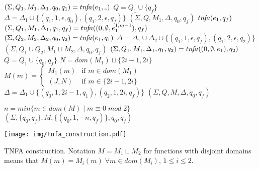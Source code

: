 \documentclass[AMA,STIX1COL]{WileyNJD-v2}
\let\oldnl\nl
\newcommand{\nonl}{\renewcommand{\nl}{\let\nl\oldnl}} %
\newcommand{\Xund}{\rule{.4em}{.4pt}}
\begin{document}
\begin{algorithm}[]
\begin{multicols}{2}
{{            $(\Sigma, Q_1, M_1, \Delta_1, q_0, q_1) = \retonfa (e_1, \Xund)$ \;
            $Q = Q_1 \cup \{q_f\}$ \;
            $\Delta = \Delta_1 \cup \{ (q_1, 1, \epsilon, q_0), (q_1, 2, \epsilon, q_f) \}$ \;
            \Return $(\Sigma, Q, M_1, \Delta, q_0, q_f)$
        }
        \BlankLine
         {
            \Return $tn\!f\!a (e_1, q_f)$
        }
        \BlankLine
         {
            $(\Sigma, Q_1, M_1, \Delta_1, q_1, q_f) = tn\!f\!a ((0, \emptyset, e_1^{1,m-1}), q_f)$ \;
            $(\Sigma, Q_2, M_2, \Delta_2, q_0, q_2) = tn\!f\!a (e_1, q_1)$ \;
            $\Delta = \Delta_1 \cup \Delta_2 \cup \{ (q_1, 1, \epsilon, q_f), (q_1, 2, \epsilon, q_2) \}$ \;
            \Return $(\Sigma, Q_1 \cup Q_2, M_1 \sqcup M_2, \Delta, q_0, q_f)$
        }
        \BlankLine
         {
            $(\Sigma, Q_1, M_1, \Delta_1, q_1, q_2) = tn\!f\!a ((0, \emptyset, e_1), q_2)$ \;
            $Q = Q_1 \cup \{q_0, q_f\}$ \;
            $N = dom(M_1) \sqcup \{2i\!-\!1,\! 2i\}$ 
            $M(m) = \begin{cases}
                M_1(m) &\text{if } m \in dom(M_1) \\[-0.3em]
                (J, N) &\text{if } m \in \{2i\!-\!1, 2i\}
            \end{cases}$ \;
            $\Delta = \Delta_1 \cup \{ (q_0, 1, 2i\!-\!1, q_1), (q_2, 1, 2i, q_f) \}$ \;
            \Return $(\Sigma, Q, M, \Delta, q_0, q_f)$
        }
    }
    \BlankLine
    \BlankLine

     {
        $n = min \{ m \in dom(M) \mid m \equiv 0 \;mod\; 2\}$ \;
        \Return $(\Sigma, \{q_0, q_f\}, M, \{ (q_0, 1, -n, q_f) \}, q_0, q_f)$ \;
    }

    \vfill

\columnbreak

    \nonl \texttt{[image: img/tnfa\_construction.pdf]}

\end{multicols}
\vspace{1.5em}
\caption{
TNFA construction.
Notation $M = M_1 \sqcup M_2$ for functions with disjoint domains
means that $M(m) = M_i(m) \;\forall m \in dom(M_i)$, $1 \leq i \leq 2$.
}\label{alg_tnfa}
\end{algorithm}
\end{document}
